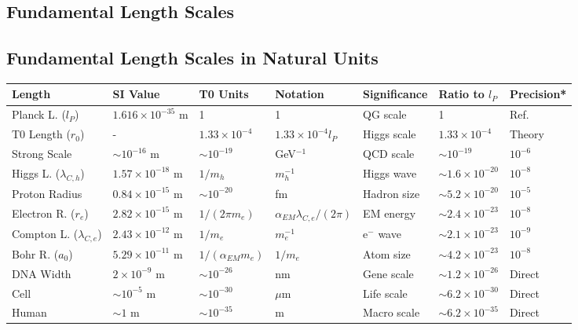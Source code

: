 \documentclass[12pt,a4paper]{article}
\begin{document}
	\subsection{Fundamental Length Scales}
\subsection{Fundamental Length Scales in Natural Units}

\begin{table}[ht]
	\centering
	\begin{adjustbox}{scale=0.7}
		\begin{tabular}{lllllll}
			\hline
			\textbf{Length} & \textbf{SI Value} & \textbf{T0 Units} & \textbf{Notation} & \textbf{Significance} & \textbf{Ratio to $l_P$} & \textbf{Precision*} \\
			\hline
			Planck L. ($l_P$) & $1.616 \times 10^{-35}$ m & 1 & 1 & QG scale & 1 & Ref. \\
			T0 Length ($r_0$) & - & $1.33 \times 10^{-4}$ & $1.33 \times 10^{-4} l_P$ & Higgs scale & $1.33 \times 10^{-4}$ & Theory \\
			Strong Scale & $\sim 10^{-16}$ m & $\sim 10^{-19}$ & GeV$^{-1}$ & QCD scale & $\sim 10^{-19}$ & $10^{-6}$ \\
			Higgs L. ($\lambda_{C,h}$) & $1.57 \times 10^{-18}$ m & $1/m_h$ & $m_h^{-1}$ & Higgs wave & $\sim 1.6 \times 10^{-20}$ & $10^{-8}$ \\
			Proton Radius & $0.84 \times 10^{-15}$ m & $\sim 10^{-20}$ & fm & Hadron size & $\sim 5.2 \times 10^{-20}$ & $10^{-5}$ \\
			Electron R. ($r_e$) & $2.82 \times 10^{-15}$ m & $1/(2\pi m_e)$ & $\alpha_{EM} \lambda_{C,e}/(2\pi)$ & EM energy & $\sim 2.4 \times 10^{-23}$ & $10^{-8}$ \\
			Compton L. ($\lambda_{C,e}$) & $2.43 \times 10^{-12}$ m & $1/m_e$ & $m_e^{-1}$ & e$^-$ wave & $\sim 2.1 \times 10^{-23}$ & $10^{-9}$ \\
			Bohr R. ($a_0$) & $5.29 \times 10^{-11}$ m & $1/(\alpha_{EM} m_e)$ & $1/m_e$ & Atom size & $\sim 4.2 \times 10^{-23}$ & $10^{-8}$ \\
			DNA Width & $2 \times 10^{-9}$ m & $\sim 10^{-26}$ & nm & Gene scale & $\sim 1.2 \times 10^{-26}$ & Direct \\
			Cell & $\sim 10^{-5}$ m & $\sim 10^{-30}$ & $\mu$m & Life scale & $\sim 6.2 \times 10^{-30}$ & Direct \\
			Human & $\sim 1$ m & $\sim 10^{-35}$ & m & Macro scale & $\sim 6.2 \times 10^{-35}$ & Direct \\

\end{tabular}
\end{adjustbox}
\end{table}
\end{document}
